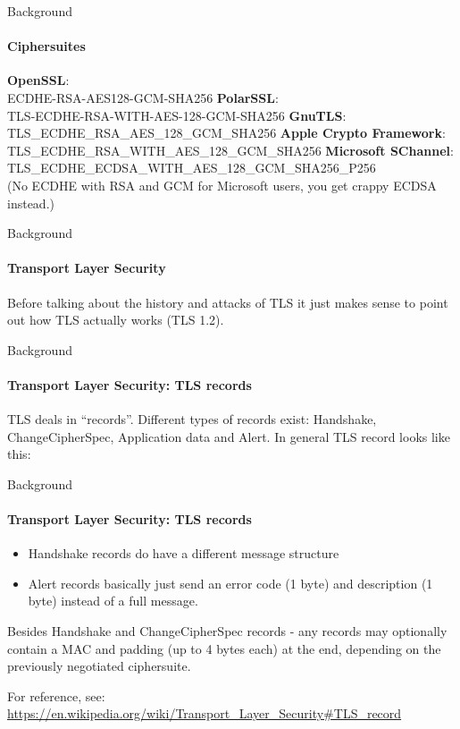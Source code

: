 \documentclass[hyperref={draft}]{beamer}
\begin{document}
\begin{frame}{Background}
  \framesubtitle{Ciphersuites}
  \textbf{OpenSSL}:\\
  ECDHE-RSA-AES128-GCM-SHA256
  \newline
  \newline
  \textbf{PolarSSL}:\\
  TLS-ECDHE-RSA-WITH-AES-128-GCM-SHA256
  \newline
  \newline
  \textbf{GnuTLS}:\\
  TLS\_ECDHE\_RSA\_AES\_128\_GCM\_SHA256
  \newline
  \newline
  \textbf{Apple Crypto Framework}:\\
  TLS\_ECDHE\_RSA\_WITH\_AES\_128\_GCM\_SHA256
  \newline
  \newline
  \textbf{Microsoft SChannel}:\\
  TLS\_ECDHE\_ECDSA\_WITH\_AES\_128\_GCM\_SHA256\_P256\\
  \tiny{(No ECDHE with RSA and GCM for Microsoft users, you get crappy ECDSA instead.)}

  \vspace{20px}
\end{frame}

\begin{frame}{Background}
  \framesubtitle{Transport Layer Security}
  Before talking about the history and attacks of TLS it just makes sense to point out how TLS actually works
  (TLS 1.2).
\end{frame}

\begin{frame}{Background}
  \framesubtitle{Transport Layer Security: TLS records}
  TLS deals in ``records''. Different types of records exist: Handshake, ChangeCipherSpec, Application data and Alert.
  \newline
  \newline
  In general TLS record looks like this:
  \small
\end{frame}

\begin{frame}{Background}
  \framesubtitle{Transport Layer Security: TLS records}
  \begin{itemize}
    \item Handshake records do have a different message structure
    \item Alert records basically just send an error code (1 byte) and description (1 byte) instead of a full message.
  \end{itemize}

  \vspace{25px}

  Besides Handshake and ChangeCipherSpec records - any records may optionally contain a MAC and padding (up to 4 bytes each) at the end, depending on the previously negotiated ciphersuite.

  \vspace{50px}

  \tiny
  For reference, see: \url{https://en.wikipedia.org/wiki/Transport\_Layer\_Security\#TLS\_record}
\end{frame}
\end{document}

